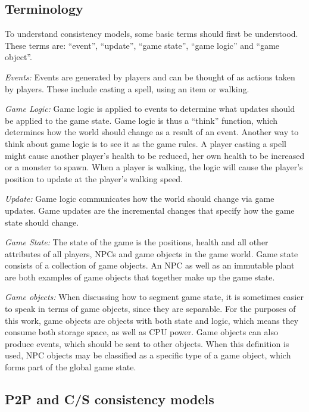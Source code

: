 \documentclass[10pt,a4paper,journal,cspaper,compsoc]{IEEEtran}
\begin{document}
\subsection{Terminology}

To understand consistency models, some basic terms should first be understood. These terms are: ``event'', ``update'', ``game state'', ``game logic''
and ``game object''.

\emph{Events:} Events are generated by players and can be thought of as actions taken by players. These include casting a spell, using an item
    or walking.

\emph{Game Logic:} Game logic is applied to events to determine what updates should be applied to the game state. Game logic is thus a
    ``think'' function, which determines how the world should change as a result of an event. Another way to think about game logic is to see
    it as the game rules. A player casting a spell might cause another player's health to be reduced, her own health to be increased or a
    monster to spawn. When a player is walking, the logic will cause the player's position to update at the player's walking speed.

\emph{Update:} Game logic communicates how the world should change via game updates. Game updates are the incremental changes that specify how
    the game state should change.

\emph{Game State:} The state of the game is the positions, health and all other attributes of all players, \acp{NPC} and game objects in the game
    world. Game state consists of a collection of game objects. An \ac{NPC} as well as an immutable plant are both examples of game objects that
    together make up the game state.

\emph{Game objects:} When discussing how to segment game state, it is sometimes easier to speak in terms of game objects, since they are
    separable. For the purposes of this work, game objects are objects with both state and logic, which means they consume both storage
    space, as well as CPU power. Game objects can also produce events, which should be sent to other objects. When this definition is used,
    NPC objects may be classified as a specific type of a game object, which forms part of the global game state.

\subsection{P2P and C/S consistency models}
\label{p2p_cs_models}
\end{document}
